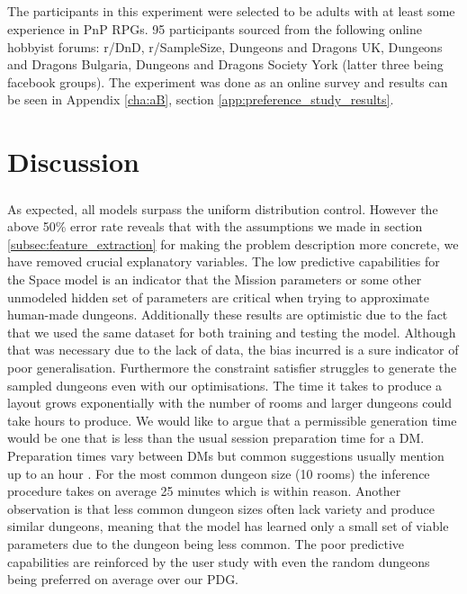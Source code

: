 \documentclass{UoYCSproject}
\begin{document}
\paragraph{}
The participants in this experiment were selected to be adults with at least some experience in PnP RPGs. 95 participants sourced from the following online hobbyist forums: r/DnD, r/SampleSize, Dungeons and Dragons UK, Dungeons and Dragons Bulgaria, Dungeons and Dragons Society York (latter three being facebook groups). The experiment was done as an online survey and results can be seen in Appendix \ref{cha:aB}, section \ref{app:preference_study_results}.


\chapter{Discussion}
\paragraph{}
As expected, all models surpass the uniform distribution control. However the above 50\% error rate reveals that with the assumptions we made in section \ref{subsec:feature_extraction} for making the problem description more concrete, we have removed crucial explanatory variables. The low predictive capabilities for the Space model is an indicator that the Mission parameters or some other unmodeled hidden set of parameters are critical when trying to approximate human-made dungeons. Additionally these results are optimistic due to the fact that we used the same dataset for both training and testing the model. Although that was necessary due to the lack of data, the bias incurred is a sure indicator of poor generalisation. Furthermore the constraint satisfier struggles to generate the sampled dungeons even with our optimisations. The time it takes to produce a layout grows exponentially with the number of rooms and larger dungeons could take hours to produce. We would like to argue that a permissible generation time would be one that is less than the usual session preparation time for a DM. Preparation times vary between DMs but common suggestions usually mention up to an hour \parencite{SessionPrepTime}. For the most common dungeon size (10 rooms) the inference procedure takes on average 25 minutes which is within reason. Another observation is that less common dungeon sizes often lack variety and produce similar dungeons, meaning that the model has learned only a small set of viable parameters due to the dungeon being less common.
The poor predictive capabilities are reinforced by the user study with even the random dungeons being preferred on average over our PDG.
\end{document}
